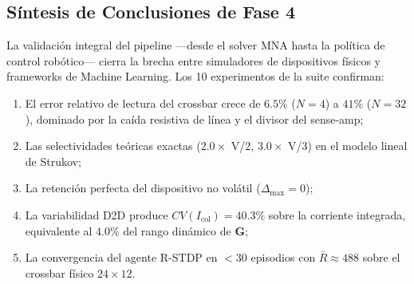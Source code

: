 \subsection{Síntesis de Conclusiones de Fase 4}
La validación integral del pipeline ---desde el solver MNA hasta la política de control robótico--- cierra la brecha entre simuladores de dispositivos físicos y frameworks de Machine Learning. Los 10 experimentos de la suite confirman:
\begin{enumerate}
    \item El error relativo de lectura del crossbar crece de $6.5\%$ ($N=4$) a
$41\%$ ($N=32$), dominado por la caída resistiva de línea y el divisor del
sense-amp;
    \item Las selectividades teóricas exactas ($2.0\times$ V/2, $3.0\times$ V/3) en el modelo lineal de Strukov;
    \item La retención perfecta del dispositivo no volátil ($\Delta_{\max} = 0$);
    \item La variabilidad D2D produce $CV(I_{\text{col}}) = 40.3\%$ sobre la
corriente integrada, equivalente al $4.0\%$ del rango dinámico de $\mathbf{G}$;
    \item La convergencia del agente R-STDP en $<30$ episodios con $\bar{R} \approx 488$ sobre el crossbar físico $24 \times 12$.
\end{enumerate}

